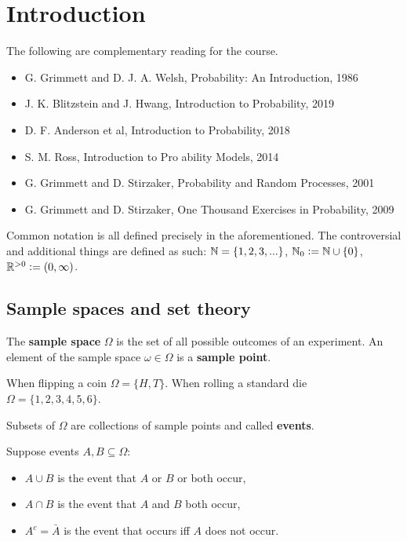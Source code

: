 \documentclass[../Year1/Year1.tex]{subfiles}
\begin{document}
\section{Introduction}


The following are complementary reading for the course.
\begin{itemize}
\item G. Grimmett and D. J. A. Welsh, Probability: An Introduction, 1986
\item J. K. Blitzstein and J. Hwang, Introduction to Probability, 2019
\item D. F. Anderson et al, Introduction to Probability, 2018
\item S. M. Ross, Introduction to Pro ability Models, 2014
\item G. Grimmett and D. Stirzaker, Probability and Random Processes, 2001
\item G. Grimmett and D. Stirzaker, One Thousand Exercises in Probability, 2009
\end{itemize}

\begin{notation*}
    Common notation is all defined precisely in the aforementioned. The controversial and additional things are defined as such: $\mathbb{N} = \{1,2,3,...\}$, $\mathbb{N}_0 := \mathbb{N} \cup \{0\}$, $\mathbb{R}^{>0} := (0,\infty)$.
\end{notation*}


\subsection{Sample spaces and set theory}

\begin{definition}
    The \textbf{sample space} $\Omega$ is the set of all possible outcomes of an experiment. An element of the sample space $\omega \in \Omega$ is a \textbf{sample point}.
\end{definition}

\begin{examples}
    When flipping a coin $\Omega  = \{H,T\}$. When rolling a standard die $\Omega = \{1,2,3,4,5,6\}$.
\end{examples}

\begin{definition}
    Subsets of $\Omega$ are collections of sample points and called \textbf{events}.
\end{definition}

Suppose events $A,B\subseteq\Omega$:
\begin{itemize}
    \item $A\cup B$ is the event that $A$ or $B$ or both occur,
    \item $A\cap B$ is the event that $A$ and $B$ both occur,
    \item $A^c = \bar{A}$ is the event that occurs iff $A$ does not occur.
\end{itemize}
\end{document}
